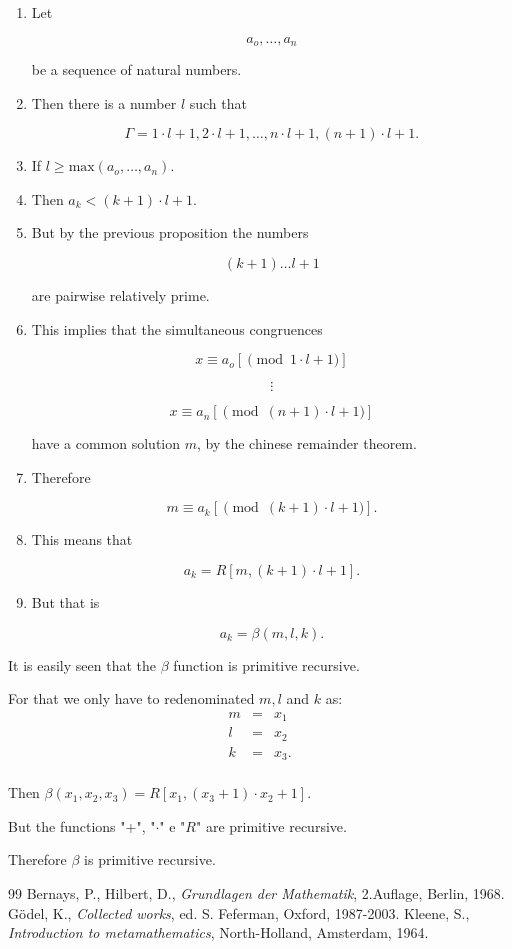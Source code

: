 \documentclass[12pt]{article}
\begin{document}
\begin{enumerate}
\item Let 

$$a_o, \ldots, a_n$$

be a sequence of natural numbers.

\item Then there is a number $l$ such that

$$\Gamma = 1 \cdot l + 1, 2 \cdot l + 1, \ldots, n \cdot l + 1, (n + 1) \cdot l + 1.$$

\item If $l \ge \text{max} (a_o, \ldots, a_n).$

\item Then $a_k < (k + 1) \cdot l + 1.$

\item But by the previous proposition the numbers

$$(k + 1) \ldots l + 1$$

are pairwise relatively prime.

\item This implies that the simultaneous congruences

$$x \equiv a_o [\pmod{1 \cdot l + 1}]$$ 

$$\vdots$$
                                  
$$x \equiv a_n [\pmod{(n + 1) \cdot l + 1}]$$

have a common solution $m$, by the chinese remainder theorem.

\item Therefore 

$$m \equiv a_k [\pmod{(k + 1) \cdot l + 1}].$$

\item This means that

$$a_k = R [m, (k + 1) \cdot l + 1].$$

\item But that is 

$$a_k = \beta (m, l, k).$$
\end{enumerate}

It is easily seen that the $\beta$ function is primitive recursive.

For that we only have to redenominated $m, l$ and $k$ as: 
\[ \begin{array}{ccc}
m & = & x_1 \\
l & = & x_2 \\
k & = & x_3. \\
\end{array} \]

Then $\beta (x_1, x_2, x_3) = R [x_1, (x_3 + 1) \cdot x_2 + 1]$.

But the functions "+", "$\cdot$" e "$R$" are primitive recursive.

Therefore $\beta$ is primitive recursive. 

\begin{thebibliography} {99}
 Bernays, P., Hilbert, D., \emph{Grundlagen der Mathematik}, 2.Auflage, Berlin, 1968.
 G\"{o}del, K., \emph{Collected works}, ed. S. Feferman, Oxford, 1987-2003.
 Kleene, S., \emph{Introduction to metamathematics}, North-Holland, Amsterdam, 1964.
\end{thebibliography}
\end{document}
